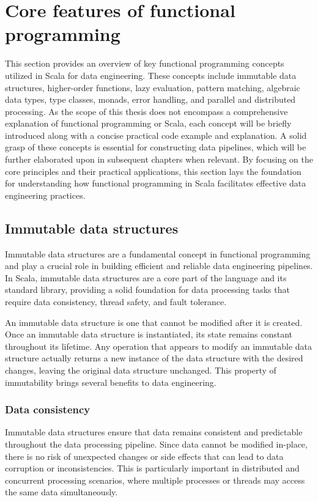 \section{Core features of functional programming}

This section provides an overview of key functional programming concepts utilized in Scala for data engineering. These concepts include immutable data structures, higher-order functions, lazy evaluation, pattern matching, algebraic data types, type classes, monads, error handling, and parallel and distributed processing. As the scope of this thesis does not encompass a comprehensive explanation of functional programming or Scala, each concept will be briefly introduced along with a concise practical code example and explanation. A solid grasp of these concepts is essential for constructing data pipelines, which will be further elaborated upon in subsequent chapters when relevant. By focusing on the core principles and their practical applications, this section lays the foundation for understanding how functional programming in Scala facilitates effective data engineering practices.

\subsection{Immutable data structures}

Immutable data structures are a fundamental concept in functional programming and play a crucial role in building efficient and reliable data engineering pipelines. In Scala, immutable data structures are a core part of the language and its standard library, providing a solid foundation for data processing tasks that require data consistency, thread safety, and fault tolerance.

An immutable data structure is one that cannot be modified after it is created. Once an immutable data structure is instantiated, its state remains constant throughout its lifetime. Any operation that appears to modify an immutable data structure actually returns a new instance of the data structure with the desired changes, leaving the original data structure unchanged. This property of immutability brings several benefits to data engineering.

\subsubsection{Data consistency}

Immutable data structures ensure that data remains consistent and predictable throughout the data processing pipeline. Since data cannot be modified in-place, there is no risk of unexpected changes or side effects that can lead to data corruption or inconsistencies. This is particularly important in distributed and concurrent processing scenarios, where multiple processes or threads may access the same data simultaneously.

